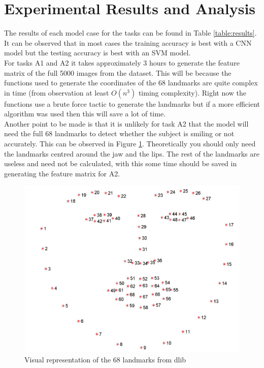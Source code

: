 \documentclass{article}
\begin{document}
\section{Experimental Results and Analysis}
\label{sec:results}
    The results of each model case for the tasks can be found in Table \ref{table:results}. It can be observed that in most cases the training accuracy is best with a CNN model but the testing accuracy is best with an SVM model.\\
    
     For tasks A1 and A2 it takes approximately 3 hours to generate the feature matrix of the full 5000 images from the dataset. This will be because the functions used to generate the coordinates of the 68 landmarks are quite complex in time (from observation at least $O(n^3)$ timing complexity). Right now the functions use a brute force tactic to generate the landmarks but if a more efficient algorithm was used then this will save a lot of time.\\
     Another point to be made is that it is unlikely for task A2 that the model will need the full 68 landmarks to detect whether the subject is smiling or not accurately. This can be observed in Figure \ref{fig:landmarks}. Theoretically you should only need the landmarks centred around the jaw and the lips. The rest of the landmarks are useless and need not be calculated, with this some time should be saved in generating the feature matrix for A2.
     \begin{figure}[htb]
     	\centering
     	\includegraphics[scale=0.4]{Figures/landmarks.PNG}
     	\caption{Visual representation of the 68 landmarks from dlib}
     	\label{fig:landmarks}
     \end{figure}
\end{document}
